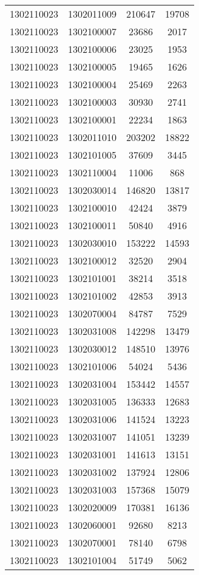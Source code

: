 \begin{longtable}{llcc}
1302110023 & 1302011009 & 210647 & 19708\\
1302110023 & 1302100007 & 23686 & 2017\\
1302110023 & 1302100006 & 23025 & 1953\\
1302110023 & 1302100005 & 19465 & 1626\\
1302110023 & 1302100004 & 25469 & 2263\\
1302110023 & 1302100003 & 30930 & 2741\\
1302110023 & 1302100001 & 22234 & 1863\\
1302110023 & 1302011010 & 203202 & 18822\\
1302110023 & 1302101005 & 37609 & 3445\\
1302110023 & 1302110004 & 11006 & 868\\
1302110023 & 1302030014 & 146820 & 13817\\
1302110023 & 1302100010 & 42424 & 3879\\
1302110023 & 1302100011 & 50840 & 4916\\
1302110023 & 1302030010 & 153222 & 14593\\
1302110023 & 1302100012 & 32520 & 2904\\
1302110023 & 1302101001 & 38214 & 3518\\
1302110023 & 1302101002 & 42853 & 3913\\
1302110023 & 1302070004 & 84787 & 7529\\
1302110023 & 1302031008 & 142298 & 13479\\
1302110023 & 1302030012 & 148510 & 13976\\
1302110023 & 1302101006 & 54024 & 5436\\
1302110023 & 1302031004 & 153442 & 14557\\
1302110023 & 1302031005 & 136333 & 12683\\
1302110023 & 1302031006 & 141524 & 13223\\
1302110023 & 1302031007 & 141051 & 13239\\
1302110023 & 1302031001 & 141613 & 13151\\
1302110023 & 1302031002 & 137924 & 12806\\
1302110023 & 1302031003 & 157368 & 15079\\
1302110023 & 1302020009 & 170381 & 16136\\
1302110023 & 1302060001 & 92680 & 8213\\
1302110023 & 1302070001 & 78140 & 6798\\
1302110023 & 1302101004 & 51749 & 5062\\

\end{longtable}
